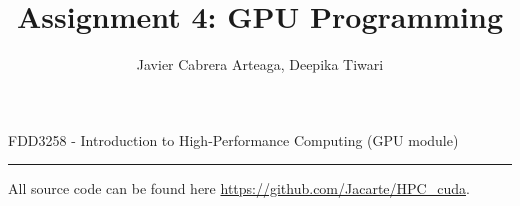 \documentclass[12pt]{article}
\begin{document}
 
 
\title{Assignment 4: GPU Programming} %
\author{Javier Cabrera Arteaga, Deepika Tiwari} %
 
\maketitle


{%
\centering
FDD3258 - Introduction to High-Performance Computing (GPU module)
\par
}
\hrule
\vspace{.2in}

All source code can be found here \url{https://github.com/Jacarte/HPC_cuda}.
\end{document}
